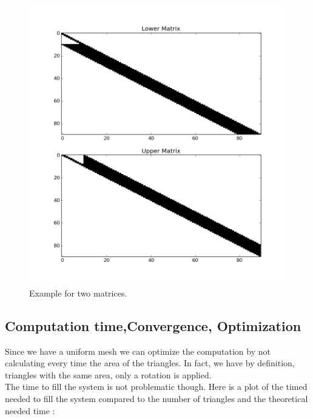 \documentclass[a4paper]{report}
\begin{document}
\begin{figure}[H]
\begin{center}
\includegraphics[scale=0.30]{LU_sparse.png}\caption{Example for two matrices.}\label{fillin}
\end{center}
\end{figure}

\subsection{Computation time,Convergence, Optimization}
Since we have a uniform mesh we can optimize the computation by not calculating every time the area of the triangles. In fact, we have by definition, triangles with the same area, only a rotation is applied.
\\
The time to fill the system is not problematic though. Here is a plot of the timed needed to fill the system compared to the number of triangles and the theoretical needed time :
\end{document}
